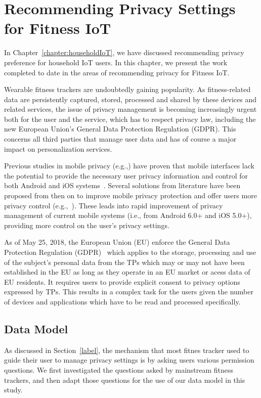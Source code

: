\chapter{Recommending Privacy Settings for Fitness IoT}\label{chapter:fitnessIoT}

In Chapter~\ref{chapter:householdIoT}, we have discussed recommending privacy preference for household IoT users. In this chapter, we present the work completed to date in the areas of recommending privacy for Fitness IoT. 

Wearable fitness trackers are undoubtedly gaining popularity. As fitness-related data are persistently captured, stored, processed and shared by these devices and related services, the issue of privacy management is becoming increasingly urgent both for the user and the service, which has to respect privacy law, including the new European Union's General Data Protection Regulation (GDPR). This concerns all third parties that manage user data and has of course a major impact on personalization services.

Previous studies in mobile privacy (e.g.,\cite{felt2012android}) have proven that mobile interfaces lack the potential to provide the necessary user privacy information and control for both Android and iOS systems~\cite{lin2014modeling}. Several solutions from literature have been proposed from then on to improve mobile privacy protection and offer users more privacy control (e.g.,~\cite{beresford2011mockdroid}). These leads into rapid improvement of privacy management of current mobile systems (i.e., from Android 6.0+ and iOS 5.0+), providing more control on the user's privacy settings.

As of May 25, 2018, the European Union (EU) enforce the General Data Protection Regulation (GDPR)~\cite{ref:GDPR} which applies to the storage, processing and use of the subject's personal data from the TPs which may or may not have been established in the EU as long as they operate in an EU market or acess data of EU residents. It requires users to provide explicit consent to privacy options expressed by TPs. This results in a complex task for the users given the number of devices and applications which have to be read and processed specifically.

\section{Data Model}
As discussed in Section~\ref{label}, the mechanism that most fitnes tracker used to guide their user to manage privacy settings is by asking users various permission questions. We first investigated the questions asked by mainstream fitness trackers, and then adapt those questions for the use of our data model in this study.

